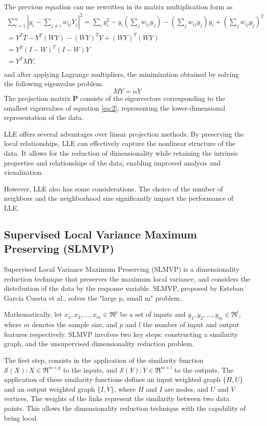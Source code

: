 The previous equation can me rewritten in its matrix multiplication form as
\begin{multline}
    \sum^n_{i=1} |y_i - \sum_{j \neq i} w_{ij} Y_j |^2 = \sum_i y_i^2 - y_i (\sum_j w_{ij}y_j) - (\sum_j w_{ij}y_j)y_i + (\sum_j w_{ij}y_j)^2 \\
    = Y^T T - Y^T (WY) - (WY)^T Y + (WY)^T (WY) \\
    = Y^T (I - W)^T (I-W)Y \\
    = Y^T M Y, \\
\end{multline}
and after applying Lagrange multipliers, the minimization obtained by solving the following eigenvalue problem.
\begin{equation} \label{eq:2}
    MY = \alpha Y
\end{equation}
The projection matrix $\mathbf{P}$ consists of the eigenvectors corresponding to the smallest eigenvalues of equation \ref{eq:2}, representing the lower-dimensional representation of the data.

LLE offers several advantages over linear projection methods. By preserving the local relationships, LLE can effectively capture the nonlinear structure of the data. It allows for the reduction of dimensionality while retaining the intrinsic properties and relationships of the data, enabling improved analysis and visualization.

However, LLE also has some considerations. The choice of the number of neighbors and the neighborhood size significantly impact the performance of LLE.

\subsection{Supervised Local Variance Maximum Preserving (SLMVP)}
Supervised Local Variance Maximum Preserving (SLMVP) is a dimensionality reduction technique that preserves the maximum local variance, and considers the distribution of the data by the response variable. SLMVP, proposed by Esteban García Cuesta et al., solves the "large p, small m" problem.

Mathematically, let $x_1, x_2, ..., x_m \in \mathfrak{R}^p$ be a set of inputs and $y_1, y_2, ..., y_m \in \mathfrak{R}^l$, where $m$ denotes the sample size, and $p$ and $l$ the number of input and output features respectively. SLMVP involves two key steps: constructing a similarity graph, and the unsupervised dimensionality reduction problem.

The first step, consists in the application of the similarity function $\mathscr{S}(X) : X \in \mathfrak{R}^{m \times p}$ to the inputs, and $\mathscr{S}(Y) : Y \in \mathfrak{R}^{m \times l}$ to the outputs. The application of these similarity functions defines an input weighted graph $\{H, U\}$ and an output weighted graph $\{I, V\}$, where $H$ and $I$ are nodes, and $U$ and $V$ vertices. The weights of the links represent the similarity between two data points. This allows the dimensionality reduction technique with the capability of being local.


